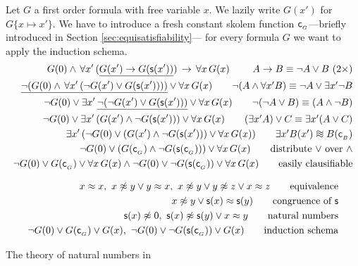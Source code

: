 \begin{example} Let \( G \) a first order formula with free variable \( x \).
	We lazily write \( G(x') \) for \( G\{x\mapsto x'\} \).
	We have to introduce a fresh constant skolem function \( \mathsf{c}_{_G} \)---briefly introduced 
	in Section \ref{sec:equisatisfiability}---
	for every formula \( G \) we want to apply the induction schema.
	\begin{align*}
		{		
			G(0) \land \, \forall x'\,
		(\underline{G(x') \limp G(\msucc(x'))})
		\, \limp \, 
		\forall x \, G(x)
		} 
		\tag*{   \( A \limp B \equiv \lnot A \lor B \ (2\times)\)}
\\
\underline{\lnot(
G(0) \land \, \forall x'\,
(\lnot G(x') \lor G(\msucc(x')))
)} \lor 
\forall x \, G(x) 
\tag*{\( \lnot(A\land \forall x' B) \equiv \lnot A\lor \exists x' \lnot B \)}
\\
\lnot G(0) \lor \exists x'\, 
\underline{\lnot(\lnot G(x') \lor G(\msucc(x')))}
\lor 
\forall x \, G(x)
\tag*{\( \lnot(\lnot A \lor B) \equiv (A \land \lnot B) \)}
\\
\lnot G(0) \lor 
\exists x'\,(G(x') \land \lnot G(\msucc(x')))
\lor 
\forall x \, G(x)
\tag*{\( (\exists x' A) \lor C \equiv \exists x' (A \lor C) \)}
\\
\exists x'\,(
\lnot G(0) \lor 
(G(x') \land \lnot G(\msucc(x')))
\lor 
\forall x \, G(x)
)
\tag*{\( \exists x' B(x') \equisat B(\mc_{_B}) \)}
\\
\lnot G(0) \lor 
(G(\mc_{_G}) \land \lnot G(\msucc(\mc_{_G}))) 
\lor 
\forall x \, G(x)
\tag*{distribute \(\lor\) over \(\land\)}
\\
{\lnot G(0) \lor 
G(\mc_{_G})
\lor 
\forall x \, G(x)}
\land
{\lnot G(0) \lor 
\lnot G(\msucc(\mc_{_G}))
\lor 
\forall x \, G(x)}
\tag*{easily clausifiable}
\end{align*}
\end{example}

\begin{table}[hbt]
	\begin{align*}
	x\mEQ x,\
	x\mNE y\lor y\mEQ x,\
	x\mNE y\lor y\mNE z\lor x\mEQ z
	\tag*{equivalence}
	\\
	x\mNE y\lor \msucc(x)\mEQ\msucc(y)
	\tag*{congruence of \( \msucc \)}
	\\
	\msucc(x) \mNE 0,\
	\msucc(x) \mNE \msucc(y) \lor x \mEQ y
	\tag*{natural numbers}
	\\
	\lnot G(0) \lor {G(\mc_{_G})} \lor G(x),\
	\lnot G(0) \lor {\lnot G(\msucc(\mc_{_G}))} \lor G(x)
	\tag*{induction schema}
	\end{align*}
	\caption{The theory of natural numbers in \CNF}\label{tab:natural:numbers}
\end{table}

